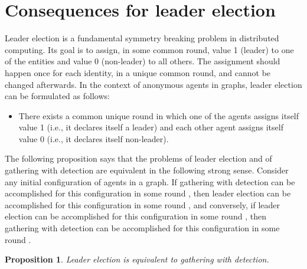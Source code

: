\documentclass[11pt]{article}
\newtheorem{proposition}{Proposition}[section]
\begin{document}
\section{Consequences for leader election}

Leader election \cite{Ly} is a fundamental symmetry breaking problem in distributed
computing. Its goal is to assign, in some common round, value 1 (leader) to one of the entities and value 0 (non-leader)
to all others. The assignment should happen once for each identity, in a unique common round, and cannot be changed afterwards. 
In the context of anonymous agents in graphs, leader election can be formulated
as follows:
\begin{itemize}
\item
There exists a common unique round in which one of the agents assigns itself value 1 (i.e., it declares itself a leader) and each 
other agent assigns itself value 0 (i.e., it declares itself non-leader).
\end{itemize}

The following proposition says that the problems of leader election and of gathering with detection are equivalent in the following strong sense.
Consider any  initial configuration of agents in a graph. If gathering with detection can be accomplished for this configuration in some round , then
leader election can be accomplished for this configuration in some round , and conversely, if leader election can be accomplished for this configuration 
in some round , then gathering with detection  can be accomplished for this configuration in some round .
 


\begin{proposition}\label{eqbis}
Leader election is equivalent to gathering with detection.
\end{proposition}
\end{document}
